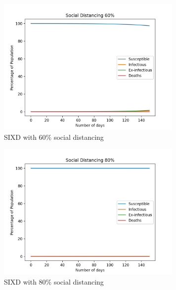 \documentclass{article}
\begin{document}
	\clearpage
	\begin{figure}[h!]
		\centering
		\includegraphics[width=90mm]{images/SIXD/social_distance_60.png}
		\caption{SIXD with $60\%$ social distancing}
	\end{figure}
	\begin{figure}[h!]
		\centering
		\includegraphics[width=90mm]{images/SIXD/social_distance_80.png}
		\caption{SIXD with $80\%$ social distancing}
	\end{figure}
	\clearpage
\end{document}
